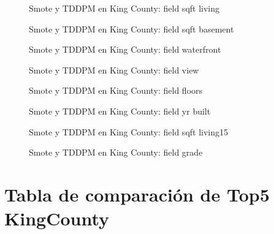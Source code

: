 \begin{figure}[H]
    \centering
    
    \caption{Smote y TDDPM en King County: field sqft living}
    \label{pair-field_sqft_living}
\end{figure}
\begin{figure}[H]
    \centering
    
    \caption{Smote y TDDPM en King County: field sqft basement}
    \label{pair-field_sqft_basement}
\end{figure}
\begin{figure}[H]
    \centering
    
    \caption{Smote y TDDPM en King County: field waterfront}
    \label{pair-field_waterfront}
\end{figure}
\begin{figure}[H]
    \centering
    
    \caption{Smote y TDDPM en King County: field view}
    \label{pair-field_view}
\end{figure}
\begin{figure}[H]
    \centering
    
    \caption{Smote y TDDPM en King County: field floors}
    \label{pair-field_floors}
\end{figure}
\begin{figure}[H]
    \centering
    
    \caption{Smote y TDDPM en King County: field yr built}
    \label{pair-field_yr_built}
\end{figure}
\begin{figure}[H]
    \centering
    
    \caption{Smote y TDDPM en King County: field sqft living15}
    \label{pair-field_sqft_living15}
\end{figure}
\begin{figure}[H]
    \centering
    
    \caption{Smote y TDDPM en King County: field grade}
    \label{pair-field_grade}
\end{figure}

\section{Tabla de comparación de Top5 KingCounty}
\label{tabla-top5-kingcounty}

